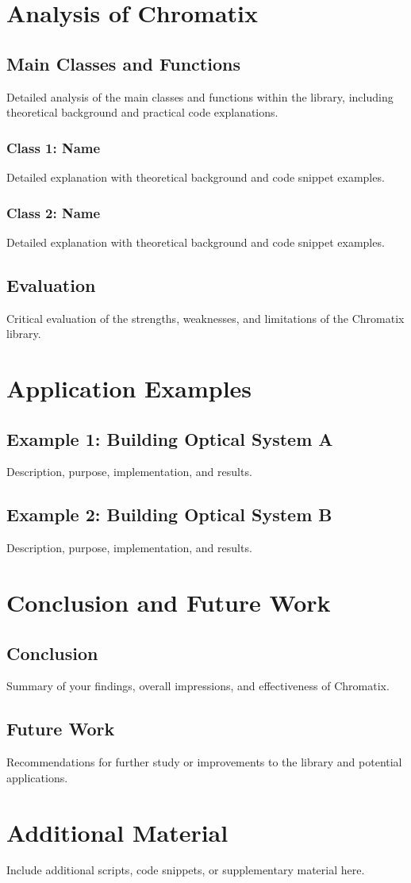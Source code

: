 \documentclass[a4paper,12pt]{report}
\begin{document}
\chapter{Analysis of Chromatix}
\section{Main Classes and Functions}
Detailed analysis of the main classes and functions within the library, including theoretical background and practical code explanations.

\subsection{Class 1: Name}
Detailed explanation with theoretical background and code snippet examples.

\subsection{Class 2: Name}
Detailed explanation with theoretical background and code snippet examples.


\section{Evaluation}
Critical evaluation of the strengths, weaknesses, and limitations of the Chromatix library.

\chapter{Application Examples}
\section{Example 1: Building Optical System A}
Description, purpose, implementation, and results.

\section{Example 2: Building Optical System B}
Description, purpose, implementation, and results.

\chapter{Conclusion and Future Work}
\section{Conclusion}
Summary of your findings, overall impressions, and effectiveness of Chromatix.

\section{Future Work}
Recommendations for further study or improvements to the library and potential applications.




\appendix
\chapter{Additional Material}
Include additional scripts, code snippets, or supplementary material here.
\end{document}
